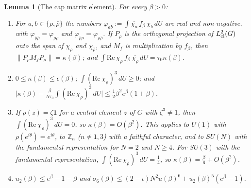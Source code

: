 \documentclass[11pt,a4paper]{article}
\newtheorem{lemma}[theorem]{Lemma}
\theoremstyle{definition}
\theoremstyle{remark}
\newcommand{\dU}{\,dU}
\newcommand{\norm}[1]{\lVert #1\rVert}
\begin{document}
\begin{lemma}[The cap matrix element]\label{mg:lem:capelement}
For every $\beta>0$:
\begin{enumerate}[label=(\roman*)]
\item For $a,b\in\{\rho,\bar\rho\}$ the numbers $\varphi_{ab}:=\int\overline{\chi_a}\,f_\beta\,\chi_b\dU$ are real and non-negative, with
$\varphi_{\bar\rho\bar\rho}=\varphi_{\rho\rho}$ and $\varphi_{\bar\rho\rho}=\varphi_{\rho\bar\rho}$. If $P_\rho$ is the orthogonal projection of
$L^2_{\rm cl}(G)$ onto the span of $\chi_\rho$ and $\chi_{\bar\rho}$, and $M_f$ is multiplication by $f_\beta$, then
$\norm{P_\rho M_fP_\rho}=\kappa(\beta)$; and $\int\mathrm{Re}\,\chi_\rho\,f_\beta\,\overline{\chi_\rho}\dU=\tau_0\kappa(\beta)$.
\item $0\le\kappa(\beta)\le\epsilon(\beta)$; $\int(\mathrm{Re}\,\chi_\rho)^3\dU\ge0$; and
$\bigl|\kappa(\beta)-\frac\beta{N\tau_0}\int(\mathrm{Re}\,\chi_\rho)^3\dU\bigr|\le\frac12\beta^2e^\beta(1+\beta)$.
\item If $\rho(z)=\zeta\mathbf1$ for a central element $z$ of $G$ with $\zeta^3\neq1$, then $\int(\mathrm{Re}\,\chi_\rho)^3\dU=0$,
so $\kappa(\beta)=O(\beta^2)$. This applies to $U(1)$ with $\rho(e^{i\theta})=e^{i\theta}$, to $\mathbb Z_n$ ($n\ne1,3$) with a faithful
character, and to $SU(N)$ with the fundamental representation for $N=2$ and $N\ge4$. For $SU(3)$ with the fundamental representation,
$\int(\mathrm{Re}\,\chi_\rho)^3\dU=\frac14$, so $\kappa(\beta)=\frac\beta6+O(\beta^2)$.
\item $u_2(\beta)\le e^\beta-1-\beta$ and $\sigma_6(\beta)\le(2-\iota)N^2u(\beta)^6+u_2(\beta)^5(e^\beta-1)$.
\end{enumerate}
\end{lemma}
\end{document}

